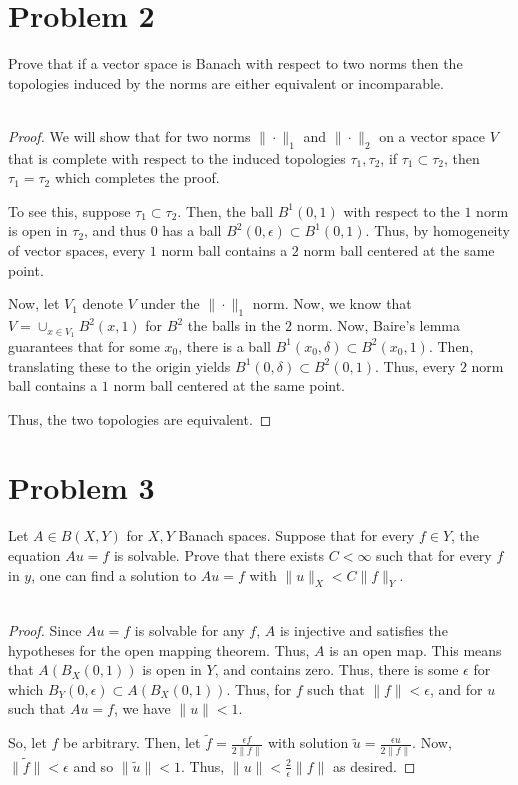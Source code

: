 \documentclass[fontsize=11pt]{scrartcl} %
\numberwithin{equation}{section} %
\numberwithin{figure}{section} %
\numberwithin{table}{section} %
\begin{document}
\section*{Problem 2}
Prove that if a vector space is Banach with respect to two norms then the
topologies induced by the norms are either equivalent or incomparable.
\\
\\
\begin{proof}
    We will show that for two norms $\|\cdot\|_1$ and $\|\cdot\|_2$ on a
    vector space $V$ that is complete with respect to the induced
    topologies $\tau_1,\tau_2$, if $\tau_1\subset \tau_2$, then $\tau_1=\tau_2$
    which completes the proof.

    To see this, suppose $\tau_1\subset\tau_2$. Then, the ball $B^1(0,1)$ with
    respect to the $1$ norm is open in $\tau_2$, and thus $0$ has a ball
    $B^2(0,\epsilon)\subset B^1(0,1)$. Thus, by homogeneity of vector spaces,
    every $1$ norm ball contains a $2$ norm ball centered at the same point.

    Now, let $V_1$ denote $V$ under the $\|\cdot\|_1$ norm. Now, we know that $V
    = \cup_{x\in V_1}B^2(x,1)$ for $B^2$ the balls in the $2$ norm. Now, Baire's
    lemma guarantees that for some $x_0$, there is a ball
    $B^1(x_0,\delta)\subset  B^2(x_0,1)$. Then, translating these to the
    origin yields $B^1(0,\delta) \subset B^2(0,1)$. Thus, every $2$ norm ball
    contains a $1$ norm ball centered at the same point.

    Thus, the two topologies are equivalent.
\end{proof}

\newpage
\section*{Problem 3}
Let $A\in B(X,Y)$ for $X,Y$ Banach spaces. Suppose that for every $f\in Y$, the
equation $Au=f$ is solvable. Prove that there exists $C<\infty$ such that for
every $f$ in $y$, one can find a solution to $Au=f$ with $\|u\|_X < C\|f\|_Y$.
\\
\\
\begin{proof}
    Since $Au=f$ is solvable for any $f$, $A$ is injective and satisfies the
    hypotheses for the open mapping theorem. Thus, $A$ is an open map.
    This means that $A(B_X(0,1))$ is open in $Y$, and contains zero. Thus, there
    is some $\epsilon$ for which $B_Y(0,\epsilon)\subset A(B_X(0,1))$. Thus, for
    $f$ such that $\|f\|<\epsilon$, and for $u$ such that $Au=f$, we have
    $\|u\|<1$.

    So, let $f$ be arbitrary. Then, let $\tilde{f} = \frac{\epsilon f}{2\|f\|}$
    with solution $\tilde{u} = \frac{\epsilon u}{2\|f\|}$. Now, $\|\tilde{f}\| <
    \epsilon$ and so $\|\tilde{u}\|<1$. Thus, $\|u\| < \frac{2}{\epsilon}\|f\|$
    as desired.
\end{proof}
\end{document}
